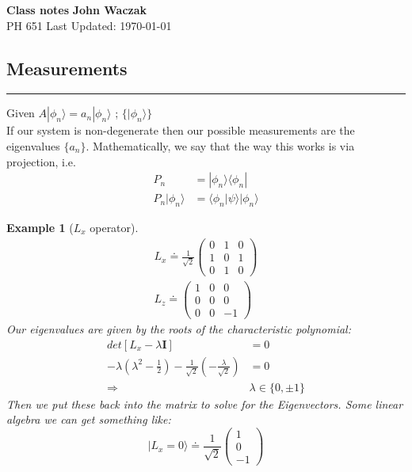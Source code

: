 \documentclass[a4paper, 11pt]{article}
\newtheorem*{Example}{Example}
\begin{document}
\noindent
\large\textbf{Class notes} \hfill \textbf{John Waczak} \\
\normalsize PH 651 \hfill  Last Updated: \today \\
	
	
\subsection*{Measurements} 
\par\noindent\rule{\textwidth}{0.4pt}
Given $A|\phi_n\rangle = a_n |\phi_n\rangle$ ; $\{|\phi_n\rangle\} $ \\ 
If our system is non-degenerate then our possible measurements are the eigenvalues $\{a_n\}$. Mathematically, we say that the way this works is via projection, i.e. 
	\begin{align}
		P_n &= |\phi_n\rangle\langle \phi_n| \\ 
		P_n |\phi_n\rangle &= \langle\phi_n|\psi\rangle |\phi_n \rangle 
	\end{align}
	
\begin{Example}[$L_x$ operator]
	\begin{align*}
		L_x \doteq \frac{1}{\sqrt{2}} \begin{pmatrix}
		0 & 1 & 0 \\ 
		1 & 0 & 1 \\ 
		0 & 1 & 0 
		\end{pmatrix} \\
		L_z \doteq \begin{pmatrix}
		1 & 0 & 0 \\ 
		0 & 0 & 0 \\ 
		0 & 0 & -1 
		\end{pmatrix}
	\end{align*}
	Our eigenvalues are given by the roots of the characteristic polynomial: 
	\begin{align*}
		det[L_x-\lambda \mathbf{I}] &= 0 \\ 
		-\lambda(\lambda^2-\frac{1}{2})-\frac{1}{\sqrt{2}}(-\frac{\lambda}{\sqrt{2}}) &= 0 \\
		\Rightarrow &\lambda \in \{0, \pm 1\}
	\end{align*}
	Then we put these back into the matrix to solve for the Eigenvectors. Some linear algebra we can get something like: 
		\begin{equation*}
			|L_x=0\rangle \doteq \frac{1}{\sqrt{2}}\begin{pmatrix}1 \\ 0 \\ -1\end{pmatrix}
		\end{equation*}
\end{Example}
\end{document}
